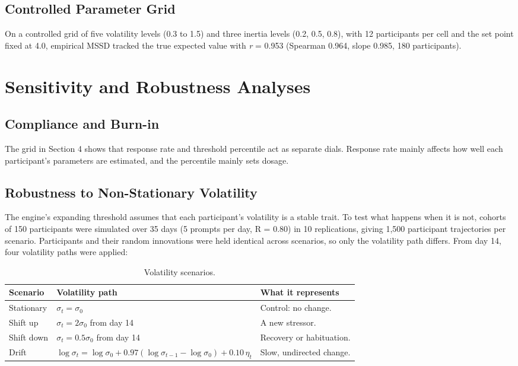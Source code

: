 \documentclass[11pt,letterpaper]{article}
\begin{document}
\subsection{Controlled Parameter Grid}

On a controlled grid of five volatility levels (0.3 to 1.5) and three inertia levels (0.2, 0.5, 0.8), with 12 participants per cell and the set point fixed at 4.0, empirical MSSD tracked the true expected value with \textit{r} = 0.953 (Spearman 0.964, slope 0.985, 180 participants).

\section{Sensitivity and Robustness Analyses}

\subsection{Compliance and Burn-in}

The grid in Section 4 shows that response rate and threshold percentile act as separate dials. Response rate mainly affects how well each participant's parameters are estimated, and the percentile mainly sets dosage.

\subsection{Robustness to Non-Stationary Volatility}

The engine's expanding threshold assumes that each participant's volatility is a stable trait. To test what happens when it is not, cohorts of 150 participants were simulated over 35 days (5 prompts per day, R = 0.80) in 10 replications, giving 1,500 participant trajectories per scenario. Participants and their random innovations were held identical across scenarios, so only the volatility path differs. From day 14, four volatility paths were applied:

\begin{table}[htbp]
\centering
\small
\begin{tabular}{@{}llp{5.5cm}@{}}
\toprule
\textbf{Scenario} & \textbf{Volatility path} & \textbf{What it represents} \\
\midrule
Stationary & $\sigma_t = \sigma_0$ & Control: no change. \\
Shift up & $\sigma_t = 2\sigma_0$ from day 14 & A new stressor. \\
Shift down & $\sigma_t = 0.5\sigma_0$ from day 14 & Recovery or habituation. \\
Drift & $\log \sigma_t = \log \sigma_0 + 0.97(\log \sigma_{t-1} - \log \sigma_0) + 0.10\,\eta_t$ & Slow, undirected change. \\
\bottomrule
\end{tabular}
\caption{Volatility scenarios.}
\end{table}
\end{document}
